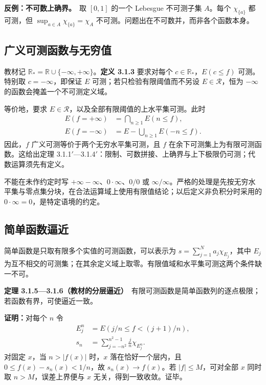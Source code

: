 \documentclass[11pt,a4paper]{article}
\begin{document}
\textbf{反例：不可数上确界。}　取 \([0,1]\) 的一个 Lebesgue 不可测子集
\(A\)。每个 \(\chi_{\{a\}}\) 都可测，但
\(\sup_{a\in A}\chi_{\{a\}}=\chi_A\)
不可测。问题出在不可数并，而非各个函数本身。

\subsection*{广义可测函数与无穷值}\label{ux5e7fux4e49ux53efux6d4bux51fdux6570ux4e0eux65e0ux7a77ux503c}

教材记 \(\mathbb R_*=\mathbb R\cup\{-\infty,+\infty\}\)。\textbf{定义
3.1.3} 要求对每个 \(c\in\mathbb R_*\)，\(E(c\le f)\) 可测。特别取
\(c=-\infty\)，即保证 \(E\) 可测；若只检验有限阈值而不另设
\(E\in\mathcal R\)，恒为 \(-\infty\) 的函数会掩盖一个不可测定义域。

等价地，要求 \(E\in\mathcal R\)，以及全部有限阈值的上水平集可测。此时 \[
\begin{aligned}
E(f=+\infty)&=\bigcap_{n\ge1}E(n\le f),\\
E(f=-\infty)&=E-\bigcup_{n\ge1}E(-n\le f).
\end{aligned}
\] 因此，\(f\) 广义可测等价于两个无穷水平集可测，且 \(f\)
在余下可测集上为有限可测函数。这给出定理
3.1.1\ensuremath{'}---3.1.4\ensuremath{'}：限制、可数拼接、上确界与上下极限仍可测；代数运算须先有定义。

不能在未作约定时写 \(+\infty-\infty\)、\(0\cdot\infty\)、\(0/0\) 或
\(\infty/\infty\)。严格的处理是先按无穷水平集与零点集分块，在合法运算域上使用有限值结论；以后定义非负积分时采用的
\(0\cdot\infty=0\)，是特定语境的约定。

\subsection*{简单函数逼近}\label{ux7b80ux5355ux51fdux6570ux903cux8fd1}

简单函数是只取有限多个实值的可测函数，可以表示为
\(s=\sum_{j=1}^N a_j\chi_{E_j}\)，其中 \(E_j\)
为互不相交的可测集；在其余定义域上取零。有限值域和水平集可测这两个条件缺一不可。

\textbf{定理
3.1.5---3.1.6（教材的分层逼近）}　有限可测函数是简单函数列的逐点极限；若函数有界，可使逼近一致。

\textbf{证明：}对每个 \(n\) 令 \[
\begin{aligned}
E_j^n&=E(j/n\le f<(j+1)/n),\\
s_n&=\sum_{j=-n^2}^{n^2-1}\frac jn\chi_{E_j^n}.
\end{aligned}
\] 对固定 \(x\)，当 \(n>|f(x)|\) 时，\(x\) 落在恰好一个层内，且
\(0\le f(x)-s_n(x)<1/n\)，故 \(s_n(x)\to f(x)\)。若
\(|f|\le M\)，可对全部 \(x\) 同时取 \(n>M\)，误差上界便与 \(x\)
无关，得到一致收敛。证毕。
\end{document}
